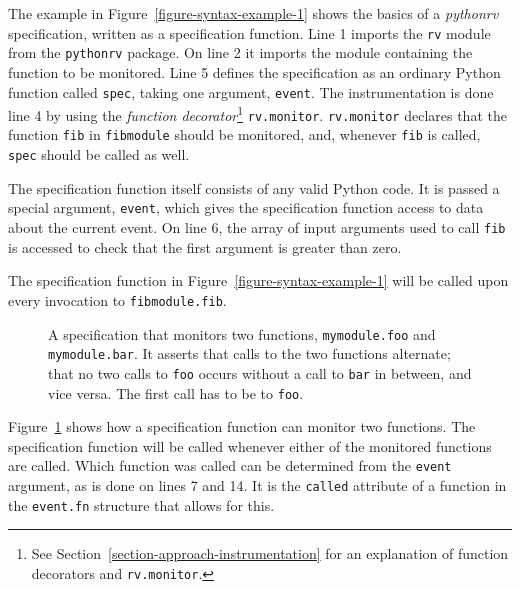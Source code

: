 \documentclass[a4paper,11pt]{kth-mag}
\begin{document}
The example in Figure~\ref{figure-syntax-example-1} shows the basics of a
\textit{pythonrv} specification, written as a specification function. Line 1
imports the \texttt{rv} module from the \texttt{pythonrv} package. On line 2 it
imports the module containing the function to be monitored. Line 5 defines
the specification as an ordinary Python function called \texttt{spec}, taking
one argument, \texttt{event}. The instrumentation is done line 4 by using the
\textit{function decorator}\footnote{See
Section~\ref{section-approach-instrumentation} for an explanation of function
decorators and \texttt{rv.monitor}.} \texttt{rv.monitor}. \texttt{rv.monitor}
declares that the function \texttt{fib} in \texttt{fibmodule} should be
monitored, and, whenever \texttt{fib} is called, \texttt{spec} should be called
as well.

The specification function itself consists of any valid Python code. It is
passed a special argument, \texttt{event}, which gives the specification
function access to data about the current event. On line 6, the array of input
arguments used to call \texttt{fib} is accessed to check that the first
argument is greater than zero.

The specification function in Figure~\ref{figure-syntax-example-1} will be
called upon every invocation to \texttt{fibmodule.fib}.

\begin{figure}[h!]
	\begin{center}
	\begin{minipage}{0.7\textwidth}
	
	\end{minipage}
	\end{center}

	\caption{A specification that monitors two functions, \texttt{mymodule.foo}
		and \texttt{mymodule.bar}. It asserts that calls to the two functions
		alternate; that no two calls to \texttt{foo} occurs without a call to
		\texttt{bar} in between, and vice versa. The first call has to be to
		\texttt{foo}.}
	\label{figure-syntax-example-2}
\end{figure}

Figure~\ref{figure-syntax-example-2} shows how a specification function can
monitor two functions. The specification function will be called whenever
either of the monitored functions are called. Which function was called can be
determined from the \texttt{event} argument, as is done on lines 7 and 14. It
is the \texttt{called} attribute of a function in the \texttt{event.fn}
structure that allows for this.
\end{document}
